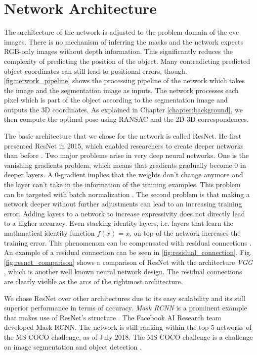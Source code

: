 \section{Network Architecture}

The architecture of the network is adjusted to the problem domain of the \ac{evc} images. There is no mechanism of inferring the masks and the network expects RGB-only images without depth information. This significantly reduces the complexity of predicting the position of the object. Many contradicting predicted object coordinates can still lead to positional errors, though. \fig \ref{fig:network_pipeline} shows the processing pipeline of the network which takes the image and the segmentation image as inputs. The network processes each pixel which is part of the object according to the segmentation image and outputs the 3D coordinates. As explained in Chapter \ref{chapter:background}, we then compute the optimal pose using RANSAC and the 2D-3D correspondences.

The basic architecture that we chose for the network is called ResNet. He \etal first presented ResNet in 2015, which enabled researchers to create deeper networks than before \cite{resnet}. Two major problems arise in very deep neural networks. One is the vanishing gradients problem, which means that gradients gradually become 0 in deeper layers. A 0-gradient implies that the weights don't change anymore and the layer can't take in the information of the training examples. This problem can be targeted with batch normalization \cite{resnet}. The second problem is that making a network deeper without further adjustments can lead to an increasing training error. Adding layers to a network to increase expressivity does not directly lead to a higher accuracy. Even stacking identity layers, i.e. layers that learn the mathmatical identity function $f(x) = x$, on top of the network increases the training error. This phenomenom can be compensated with residual connections \cite{resnet}. An example of a residual connection can be seen in \fig \ref{fig:residual_connection}. Fig. \ref{fig:resnet_comparison} shows a comparison of ResNet with the architecture \textit{VGG} \cite{vgg}, which is another well known neural network design. The residual connections are clearly visible as the arcs of the rightmost architecture.

We chose ResNet over other architectures due to its easy scalability and its still superior performance in terms of accuracy. \textit{Mask RCNN} is a prominent example that makes use of ResNet's structure \cite{mask_rcnn}. The Facebook AI Research team developed Mask RCNN. The network is still ranking within the top 5 networks of the MS COCO challenge, as of July 2018. The MS COCO challenge is a challenge on image segmentation and object detection \cite{mscoco}.

